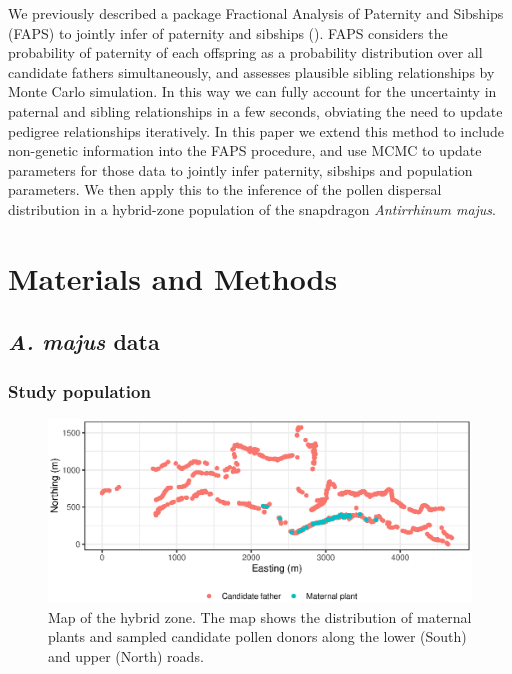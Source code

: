 \documentclass[10pt, a4paper, twocolumn]{article} %
\begin{document}
We previously described a package Fractional Analysis of Paternity and Sibships (FAPS) to jointly infer of paternity and sibships (\cite{ellis2018efficient}).
FAPS considers the probability of paternity of each offspring as a probability distribution over all candidate fathers simultaneously, and assesses plausible sibling relationships by Monte Carlo simulation.
In this way we can fully account for the uncertainty in paternal and sibling relationships in a few seconds, obviating the need to update pedigree relationships iteratively.
In this paper we extend this method to include non-genetic information into the FAPS procedure, and use MCMC to update parameters for those data to jointly infer paternity, sibships and population parameters.
We then apply this to the inference of the pollen dispersal distribution in a hybrid-zone population of the snapdragon \textit{Antirrhinum majus}.


\section{Materials and Methods}

\subsection{\textit{A. majus} data}

\subsubsection{Study population}

\begin{figure}
    \centering
	\includegraphics[]{map.eps} %
	\caption{Map of the hybrid zone. The map shows the distribution of maternal plants and sampled candidate pollen donors along the lower (South) and upper (North) roads.}
	\label{fig:map} %
\end{figure}
\end{document}
